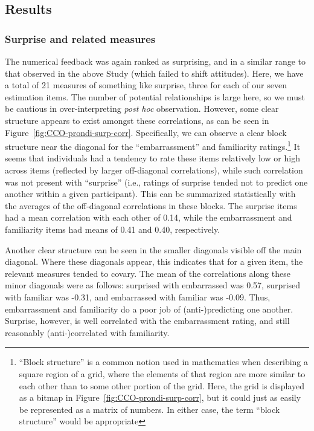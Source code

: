 \subsection{Results}

\subsubsection{Surprise and related measures}

The numerical feedback was again ranked as surprising, and in a similar range to
that observed in the above Study (which failed to shift attitudes). Here, we
have a total of 21 measures of something like surprise, three for each of our
seven estimation items.  The number of potential relationships is large here, so
we must be cautious in over-interpreting \emph{post hoc} observation. However,
some clear structure appears to exist amongst these correlations, as can be seen
in Figure~\ref{fig:CCO-prondi-surp-corr}. Specifically, we can observe a clear
block structure near the diagonal for the “embarrassment” and familiarity
ratings.\footnote{“Block structure” is a common notion used in mathematics when
    describing a square region of a grid, where the elements of that region are
    more similar to each other than to some other portion of the grid. Here, the
    grid is displayed as a bitmap in Figure~\ref{fig:CCO-prondi-surp-corr}, but
    it could just as easily be represented as a matrix of numbers. In either
    case, the term “block structure” would be appropriate} It seems that
individuals had a tendency to rate these items relatively low or high across
items (reflected by larger off-diagonal correlations), while such correlation
was not present with “surprise” (i.e., ratings of surprise tended not to predict
one another within a given participant). This can be summarized statistically with the
averages of the off-diagonal correlations in these blocks. The surprise items
had a mean correlation with each other of 0.14, while the embarrassment and
familiarity items had means of 0.41 and 0.40, respectively.

Another clear structure can be seen in the smaller diagonals visible off the
main diagonal.  Where these diagonals appear, this indicates that for a given
item, the relevant measures tended to covary. The mean of the correlations along
these minor diagonals were as follows: surprised with embarrassed was 0.57,
surprised with familiar was -0.31, and embarrassed with familiar was -0.09.
Thus, embarrassment and familiarity do a poor job of (anti-)predicting one another.
Surprise, however, is well correlated with the embarrassment rating, and still
reasonably (anti-)correlated with familiarity. 

